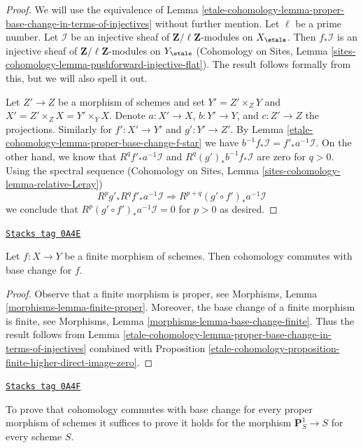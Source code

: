 \begin{proof}
We will use the equivalence of
Lemma \ref{etale-cohomology-lemma-proper-base-change-in-terms-of-injectives}
without further mention. Let $\ell$ be a prime number.
Let $\mathcal{I}$ be an injective sheaf of
$\mathbf{Z}/\ell\mathbf{Z}$-modules on $X_\etale$.
Then $f_*\mathcal{I}$ is an injective sheaf of
$\mathbf{Z}/\ell\mathbf{Z}$-modules on $Y_\etale$
(Cohomology on Sites, Lemma
\ref{sites-cohomology-lemma-pushforward-injective-flat}).
The result follows formally from this, but we will also
spell it out.

\medskip\noindent
Let $Z' \to Z$ be a morphism of schemes and set
$Y' = Z' \times_Z Y$ and $X' = Z' \times_Z X = Y' \times_ Y X$.
Denote $a : X' \to X$, $b : Y' \to Y$, and $c : Z' \to Z$ the
projections. Similarly for $f' : X' \to Y'$ and $g' : Y' \to Z'$.
By Lemma \ref{etale-cohomology-lemma-proper-base-change-f-star} we have
$b^{-1}f_*\mathcal{I} = f'_*a^{-1}\mathcal{I}$.
On the other hand, we know that $R^qf'_*a^{-1}\mathcal{I}$ and
$R^q(g')_*b^{-1}f_*\mathcal{I}$ are zero for $q > 0$.
Using the spectral sequence
(Cohomology on Sites, Lemma \ref{sites-cohomology-lemma-relative-Leray})
$$
R^pg'_* R^qf'_* a^{-1}\mathcal{I} \Rightarrow
R^{p + q}(g' \circ f')_* a^{-1}\mathcal{I}
$$
we conclude that $R^p(g' \circ f')_*a^{-1}\mathcal{I} = 0$ for
$p > 0$ as desired.
\end{proof}

\begin{lemma}
\label{etale-cohomology-lemma-finite}
\href{https://stacks.math.columbia.edu/tag/0A4E}{\texttt{Stacks tag 0A4E}}


Let $f : X \to Y$ be a finite morphism of schemes.
Then cohomology commutes with base change for $f$.
\end{lemma}

\begin{proof}
Observe that a finite morphism is proper, see
Morphisms, Lemma \ref{morphisms-lemma-finite-proper}.
Moreover, the base change of a finite morphism is finite, see
Morphisms, Lemma \ref{morphisms-lemma-base-change-finite}.
Thus the result follows from
Lemma \ref{etale-cohomology-lemma-proper-base-change-in-terms-of-injectives}
combined with
Proposition \ref{etale-cohomology-proposition-finite-higher-direct-image-zero}.
\end{proof}

\begin{lemma}[Reduce to P1]
\label{etale-cohomology-lemma-reduce-to-P1}
\href{https://stacks.math.columbia.edu/tag/0A4F}{\texttt{Stacks tag 0A4F}}

To prove that cohomology commutes with base change for
every proper morphism of schemes it suffices to prove it
holds for the morphism $\mathbf{P}^1_S \to S$ for every scheme $S$.
\end{lemma}

